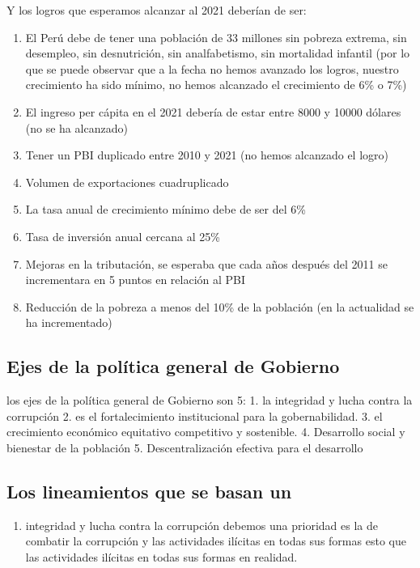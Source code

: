 \documentclass[
  a4paper,
]{article}
\providecommand{\tightlist}{%
  \setlength{\itemsep}{0pt}\setlength{\parskip}{0pt}}\usepackage{longtable,booktabs,array}
\begin{document}
Y los logros que esperamos alcanzar al 2021 deberían de ser:

\begin{enumerate}
\def\labelenumi{\arabic{enumi}.}
\tightlist
\item
  El Perú debe de tener una población de 33 millones sin pobreza
  extrema, sin desempleo, sin desnutrición, sin analfabetismo, sin
  mortalidad infantil (por lo que se puede observar que a la fecha no
  hemos avanzado los logros, nuestro crecimiento ha sido mínimo, no
  hemos alcanzado el crecimiento de 6\% o 7\%)
\item
  El ingreso per cápita en el 2021 debería de estar entre 8000 y 10000
  dólares (no se ha alcanzado)
\item
  Tener un PBI duplicado entre 2010 y 2021 (no hemos alcanzado el logro)
\item
  Volumen de exportaciones cuadruplicado
\item
  La tasa anual de crecimiento mínimo debe de ser del 6\%
\item
  Tasa de inversión anual cercana al 25\%
\item
  Mejoras en la tributación, se esperaba que cada años después del 2011
  se incrementara en 5 puntos en relación al PBI
\item
  Reducción de la pobreza a menos del 10\% de la población (en la
  actualidad se ha incrementado)
\end{enumerate}

\subsection{Ejes de la política general de
Gobierno}\label{ejes-de-la-poluxedtica-general-de-gobierno}

los ejes de la política general de Gobierno son 5: 1. la integridad y
lucha contra la corrupción 2. es el fortalecimiento institucional para
la gobernabilidad. 3. el crecimiento económico equitativo competitivo y
sostenible. 4. Desarrollo social y bienestar de la población 5.
Descentralización efectiva para el desarrollo

\subsection{Los lineamientos que se basan
un}\label{los-lineamientos-que-se-basan-un}

\begin{enumerate}
\def\labelenumi{\arabic{enumi}.}
\tightlist
\item
  integridad y lucha contra la corrupción debemos una prioridad es la de
  combatir la corrupción y las actividades ilícitas en todas sus formas
  esto que las actividades ilícitas en todas sus formas en realidad.
\end{enumerate}
\end{document}
